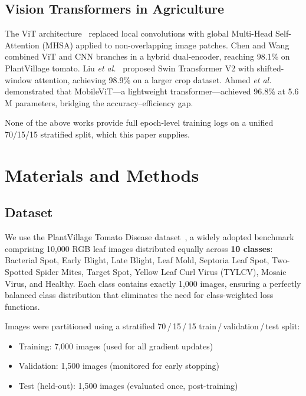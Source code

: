 \documentclass[journal]{IEEEtran}
\begin{document}
\subsection{Vision Transformers in Agriculture}

The ViT architecture~\cite{dosovitskiy2020image} replaced local
convolutions with global Multi-Head Self-Attention (MHSA)
applied to non-overlapping image patches.
Chen and Wang~\cite{chen2026hybrid} combined ViT and CNN branches
in a hybrid dual-encoder, reaching 98.1\% on PlantVillage tomato.
Liu \textit{et al.}~\cite{liu2021swin} proposed Swin Transformer
V2 with shifted-window attention, achieving 98.9\% on a larger
crop dataset.
Ahmed \textit{et al.}~\cite{ahmed2025mobilevit} demonstrated that
MobileViT---a lightweight transformer---achieved 96.8\% at 5.6\,M
parameters, bridging the accuracy--efficiency gap.

None of the above works provide full epoch-level training logs on a
unified 70/15/15 stratified split, which this paper supplies.

\section{Materials and Methods}
\label{sec:methods}

\subsection{Dataset}

We use the PlantVillage Tomato Disease
dataset~\cite{mohanty2016using}, a widely adopted benchmark
comprising 10,000 RGB leaf images distributed equally across
\textbf{10 classes}: Bacterial Spot, Early Blight, Late Blight,
Leaf Mold, Septoria Leaf Spot, Two-Spotted Spider Mites, Target
Spot, Yellow Leaf Curl Virus (TYLCV), Mosaic Virus, and Healthy.
Each class contains exactly 1,000 images, ensuring a
perfectly balanced class distribution that eliminates the need
for class-weighted loss functions.

Images were partitioned using a stratified 70\,/\,15\,/\,15
train\,/\,validation\,/\,test split:
\begin{itemize}
  \item Training: 7,000 images (used for all gradient updates)
  \item Validation: 1,500 images (monitored for early stopping)
  \item Test (held-out): 1,500 images (evaluated once, post-training)
\end{itemize}
\end{document}
